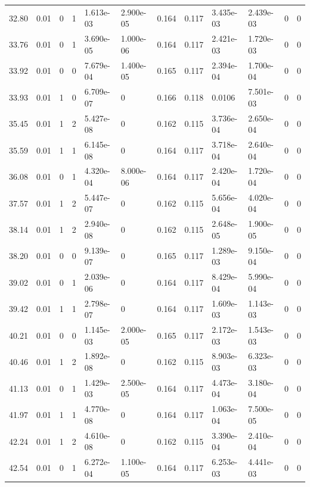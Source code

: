 \documentclass[preview]{standalone}
\begin{document}
{{{\begin{tabular}{L{1.2cm}C{1.2cm} C{0.3cm}C{0.5cm} C{1.4cm}C{1.4cm} C{1.4cm}C{1.4cm} C{1.6cm}C{1.6cm} C{1.6cm}C{1.6cm}}
  32.80  &  0.01  & 0     &  1 &  1.613e-03  & 2.900e-05  &  0.164&   0.117& 3.435e-03 & 2.439e-03   &  0 & 0  \\ 
  33.76  &  0.01  & 0     &  1 &  3.690e-05  & 1.000e-06  &  0.164&   0.117& 2.421e-03 & 1.720e-03   &  0 & 0  \\ 
  33.92  &  0.01  & 0     &  0 &  7.679e-04  & 1.400e-05  &  0.165&   0.117& 2.394e-04 & 1.700e-04   &  0 & 0  \\ 
  33.93  &  0.01  & 1     &  0 &  6.709e-07  & 0  &  0.166&   0.118& 0.0106 & 7.501e-03   &  0 & 0  \\ 
  35.45  &  0.01  & 1     &  2 &  5.427e-08  & 0  &  0.162&   0.115& 3.736e-04 & 2.650e-04   &  0 & 0  \\ 
  35.59  &  0.01  & 1     &  1 &  6.145e-08  & 0  &  0.164&   0.117& 3.718e-04 & 2.640e-04   &  0 & 0  \\ 
  36.08  &  0.01  & 0     &  1 &  4.320e-04  & 8.000e-06  &  0.164&   0.117& 2.420e-04 & 1.720e-04   &  0 & 0  \\ 
  37.57  &  0.01  & 1     &  2 &  5.447e-07  & 0  &  0.162&   0.115& 5.656e-04 & 4.020e-04   &  0 & 0  \\ 
  38.14  &  0.01  & 1     &  2 &  2.940e-08  & 0  &  0.162&   0.115& 2.648e-05 & 1.900e-05   &  0 & 0  \\ 
  38.20  &  0.01  & 0     &  0 &  9.139e-07  & 0  &  0.165&   0.117& 1.289e-03 & 9.150e-04   &  0 & 0  \\ 
  39.02  &  0.01  & 0     &  1 &  2.039e-06  & 0  &  0.164&   0.117& 8.429e-04 & 5.990e-04   &  0 & 0  \\ 
  39.42  &  0.01  & 1     &  1 &  2.798e-07  & 0  &  0.164&   0.117& 1.609e-03 & 1.143e-03   &  0 & 0  \\ 
  40.21  &  0.01  & 0     &  0 &  1.145e-03  & 2.000e-05  &  0.165&   0.117& 2.172e-03 & 1.543e-03   &  0 & 0  \\ 
  40.46  &  0.01  & 1     &  2 &  1.892e-08  & 0  &  0.162&   0.115& 8.903e-03 & 6.323e-03   &  0 & 0  \\ 
  41.13  &  0.01  & 0     &  1 &  1.429e-03  & 2.500e-05  &  0.164&   0.117& 4.473e-04 & 3.180e-04   &  0 & 0  \\ 
  41.97  &  0.01  & 1     &  1 &  4.770e-08  & 0  &  0.164&   0.117& 1.063e-04 & 7.500e-05   &  0 & 0  \\ 
  42.24  &  0.01  & 1     &  2 &  4.610e-08  & 0  &  0.162&   0.115& 3.390e-04 & 2.410e-04   &  0 & 0  \\ 
  42.54  &  0.01  & 0     &  1 &  6.272e-04  & 1.100e-05  &  0.164&   0.117& 6.253e-03 & 4.441e-03   &  0 & 0  \\ 

\end{tabular}}}}
\end{document}
